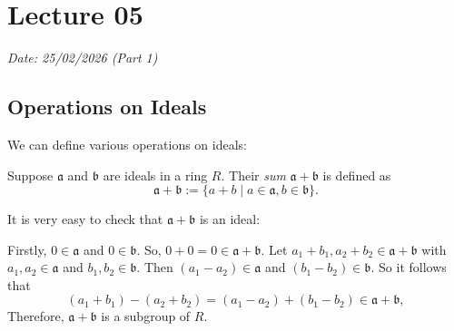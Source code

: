 \chapter{Lecture 05}\label{section:lec05pt1}
\hfill {\footnotesize \textit{Date: 25/02/2026 (Part 1)}}
\section{Operations on Ideals}
We can define various operations on ideals:
\begin{definition}
    Suppose \(\mathfrak{a}\) and \(\mathfrak{b}\) are ideals in a ring \(R\). Their \emph{sum} \(\mathfrak{a}+\mathfrak{b}\) is defined as
    \[
        \mathfrak{a} + \mathfrak{b} := \{a + b \mid a \in \mathfrak{a}, b\in \mathfrak{b}\}.
    \]
\end{definition}
It is very easy to check that \(\mathfrak{a} + \mathfrak{b}\) is an ideal:

    Firstly, \(0 \in \mathfrak{a}\) and \(0 \in \mathfrak{b}\). So, \(0+0 = 0 \in \mathfrak{a} + \mathfrak{b}\). Let \(a_1 + b_1, a_2+b_2 \in \mathfrak{a} + \mathfrak{b}\) with \(a_1, a_2 \in \mathfrak{a}\) and \(b_1, b_2 \in \mathfrak{b}\). Then \((a_1 - a_2) \in \mathfrak{a}\) and \((b_1-b_2) \in \mathfrak{b}\). So it follows that 
        \[(a_1 + b_1) - (a_2+b_2) = (a_1 - a_2) + (b_1 - b_2) \in \mathfrak{a} + \mathfrak{b}, \] Therefore,  \(\mathfrak{a} + \mathfrak{b}\) is a subgroup of \(R\). 

